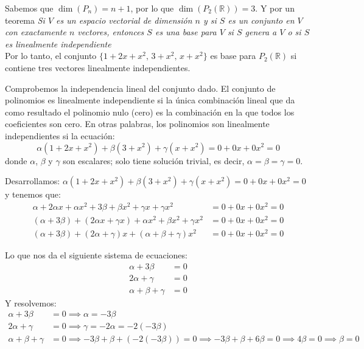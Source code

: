 \begin{enumerate}
    Sabemos que $\dim(P_{n}) = n + 1$, por lo que $\dim (P_{2}(\mathbb{R})) = 3$. Y por un teorema 
    \textit{Si $V$ es un espacio vectorial de dimensión $n$ y si $S$ es un conjunto en $V$
    con exactamente $n$ vectores, entonces $S$ es una base para $V$ si $S$ genera a $V$ o si $S$ 
    es linealmente independiente}\\
    Por lo tanto, el conjunto $\{ 1 + 2x + x^{2},\, 3 + x^{2},\, x + x^{2}\}$ es base para
    $P_{2}(\mathbb{R})$ si contiene tres vectores linealmente independientes.

    Comprobemos la independencia lineal del conjunto dado. El conjunto de polinomios es
    linealmente independiente si la única combinación lineal que da como resultado el polinomio
    nulo (cero) es la combinación en la que todos los coeficientes son cero. En otras palabras, los
    polinomios son linealmente independientes si la ecuación:
    \begin{equation*}
        \alpha(1 + 2x + x^2) + \beta(3 + x^2) + \gamma(x + x^2) = 0 + 0x + 0x^2 = 0
    \end{equation*}
    donde $\alpha$, $\beta$ y $\gamma$ son escalares; solo tiene solución trivial, es decir, $\alpha = \beta = \gamma = 0$.

    Desarrollamos: $\alpha(1 + 2x + x^2) + \beta(3 + x^2) + \gamma(x + x^2) = 0 + 0x + 0x^2 = 0$ y tenemos que:
    \begin{align*}
        \alpha + 2\alpha x + \alpha x^2 + 3\beta + \beta x^2 + \gamma x + \gamma x^2 &= 0 + 0x + 0x^2 = 0 \\
        (\alpha + 3\beta) + (2\alpha x + \gamma x) + \alpha x^2 + \beta x^2 + \gamma x^2 &= 0 + 0x + 0x^2 = 0 \\
        (\alpha + 3\beta) + (2\alpha + \gamma) x + (\alpha + \beta + \gamma) x^2 &= 0 + 0x + 0x^2 = 0
    \end{align*}
        
    Lo que nos da el siguiente sistema de ecuaciones:
    \begin{align*}
        \alpha + 3\beta &= 0 \\
        2\alpha + \gamma &= 0 \\
        \alpha + \beta + \gamma &= 0
    \end{align*}
    Y resolvemos:
    \begin{align*}
        \alpha + 3\beta &= 0 \implies \alpha = -3\beta \\
        2\alpha + \gamma &= 0 \implies \gamma = -2\alpha = -2(-3\beta) \\
        \alpha + \beta + \gamma &= 0 \implies -3\beta + \beta + (-2(-3\beta)) = 0 \implies -3\beta + \beta + 6\beta = 0 \implies 4\beta = 0 \implies \beta = 0
    \end{align*}


\end{enumerate}
